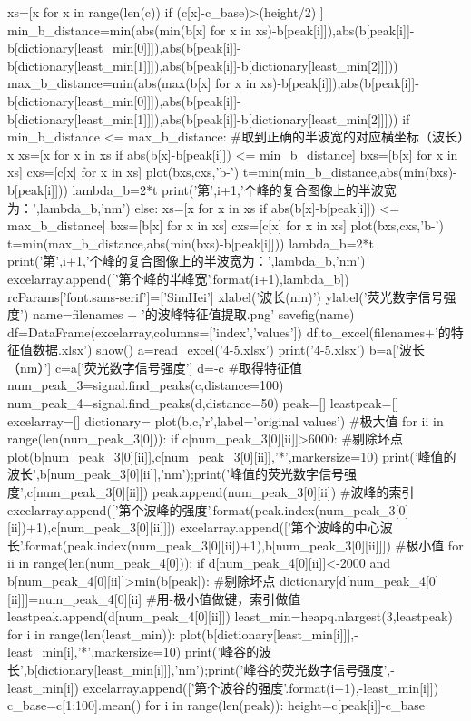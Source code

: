 \documentclass{article}
\numberwithin{equation}{subsection}
\begin{document}
\begin{python}
        xs=[x for x in range(len(c)) if (c[x]-c_base)>(height/2) ]
        min_b_distance=min(abs(min(b[x] for x in xs)-b[peak[i]]),abs(b[peak[i]]-b[dictionary[least_min[0]]]),abs(b[peak[i]]-b[dictionary[least_min[1]]]),abs(b[peak[i]]-b[dictionary[least_min[2]]]))
        max_b_distance=min(abs(max(b[x] for x in xs)-b[peak[i]]),abs(b[peak[i]]-b[dictionary[least_min[0]]]),abs(b[peak[i]]-b[dictionary[least_min[1]]]),abs(b[peak[i]]-b[dictionary[least_min[2]]]))   
        if min_b_distance <= max_b_distance:                #取到正确的半波宽的对应横坐标（波长）x
            xs=[x for x in xs if abs(b[x]-b[peak[i]]) <= min_b_distance]
            bxs=[b[x] for x in xs]
            cxs=[c[x] for x in xs]
            plot(bxs,cxs,'b-')
            t=min(min_b_distance,abs(min(bxs)-b[peak[i]]))
            lambda_b=2*t
            print('第',i+1,'个峰的复合图像上的半波宽为：',lambda_b,'nm')
        else:
            xs=[x for x in xs if abs(b[x]-b[peak[i]]) <= max_b_distance]
            bxs=[b[x] for x in xs]
            cxs=[c[x] for x in xs]
            plot(bxs,cxs,'b-')
            t=min(max_b_distance,abs(min(bxs)-b[peak[i]]))
            lambda_b=2*t
            print('第',i+1,'个峰的复合图像上的半波宽为：',lambda_b,'nm')
        excelarray.append(['第{}个峰的半峰宽'.format(i+1),lambda_b])
    rcParams['font.sans-serif']=['SimHei']
    xlabel('波长(nm)')
    ylabel('荧光数字信号强度')
    name=filenames + '的波峰特征值提取.png'
    savefig(name)
    df=DataFrame(excelarray,columns=['index','values'])
    df.to_excel(filenames+'的特征值数据.xlsx')
    show()        
a=read_excel('4-5.xlsx')
print('4-5.xlsx')
b=a['波长（nm）']
c=a['荧光数字信号强度']
d=-c
#取得特征值
num_peak_3=signal.find_peaks(c,distance=100)
num_peak_4=signal.find_peaks(d,distance=50)
peak=[]
leastpeak=[]
excelarray=[]
dictionary={}
plot(b,c,'r',label='original values')
#极大值
for ii in range(len(num_peak_3[0])):
    if c[num_peak_3[0][ii]]>6000:          #剔除坏点
        plot(b[num_peak_3[0][ii]],c[num_peak_3[0][ii]],'*',markersize=10) 
        print('峰值的波长',b[num_peak_3[0][ii]],'nm');print('峰值的荧光数字信号强度',c[num_peak_3[0][ii]])
        peak.append(num_peak_3[0][ii])          #波峰的索引
        excelarray.append(['第{}个波峰的强度'.format(peak.index(num_peak_3[0][ii])+1),c[num_peak_3[0][ii]]])
        excelarray.append(['第{}个波峰的中心波长'.format(peak.index(num_peak_3[0][ii])+1),b[num_peak_3[0][ii]]])
#极小值
for ii in range(len(num_peak_4[0])):
    if  d[num_peak_4[0][ii]]<-2000 and b[num_peak_4[0][ii]]>min(b[peak]):          #剔除坏点
        dictionary[d[num_peak_4[0][ii]]]=num_peak_4[0][ii]          #用-极小值做键，索引做值
        leastpeak.append(d[num_peak_4[0][ii]])
least_min=heapq.nlargest(3,leastpeak)
for i in range(len(least_min)):
        plot(b[dictionary[least_min[i]]],-least_min[i],'*',markersize=10) 
        print('峰谷的波长',b[dictionary[least_min[i]]],'nm');print('峰谷的荧光数字信号强度',-least_min[i])
        excelarray.append(['第{}个波谷的强度'.format(i+1),-least_min[i]])
c_base=c[1:100].mean()
for i in range(len(peak)):  
    height=c[peak[i]]-c_base


\end{python}
\end{document}
